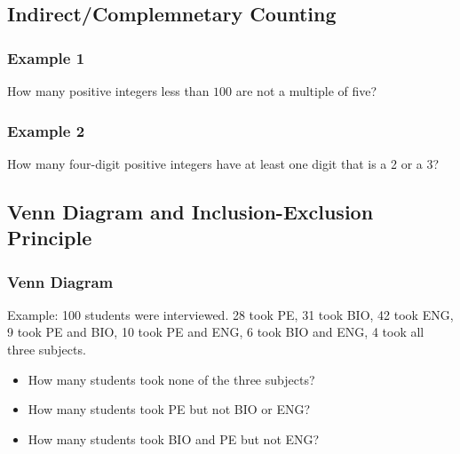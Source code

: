 \documentclass{article}
\begin{document}
\subsection{Indirect/Complemnetary Counting}
\subsubsection{Example 1}
How many positive integers less than $100$ are not a multiple of five?
\vspace{20px}

\subsubsection{Example 2}
How many four-digit positive integers have at least one digit that is a 2 or a 3?
\pagebreak

\subsection{Venn Diagram and Inclusion-Exclusion Principle}

\subsubsection{Venn Diagram}

Example:
100 students were interviewed.
28 took PE, 31 took BIO, 42 took ENG, 9 took PE and BIO, 10 took PE and ENG, 6 took BIO and ENG, 4 took all three subjects.
\begin{itemize}
    \item How many students took none of the three subjects?
    \item How many students took PE but not BIO or ENG?
    \item How many students took BIO and PE but not ENG?
\end{itemize}
\end{document}
